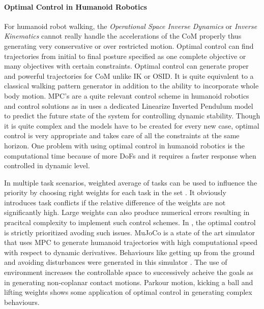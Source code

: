 \paragraph{Optimal Control in Humanoid Robotics}
For humanoid robot walking, the \textit{Operational Space Inverse Dynamics} or \textit{Inverse Kinematics} cannot really handle the accelerations of the CoM properly thus generating very conservative or over restricted motion. Optimal control can find 
trajectories from initial to final posture specified as one complete objective or many objectives with certain constraints. Optimal control can generate proper and powerful trajectories for CoM unlike IK or OSID. It is quite equivalent to a classical walking pattern generator in addition to the ability to incorporate whole body motion. MPC's are a quite relevant control scheme in humanoid robotics and control solutions as in \cite{kajita2003biped,herdt2010online} uses a dedicated Linearize Inverted Pendulum model to predict the future state of the system for controlling dynamic stability. Though it is quite complex and the models have to be created for every new case, optimal control is very appropriate and takes care of all the constraints at the same horizon. One problem with using optimal control in humanoid robotics is the computational time because of more DoFs and it requires a faster response when controlled in dynamic level.

In multiple task scenarios, weighted average of tasks can be used to influence the priority by choosing right weights for each task in the set \cite{dimitrov2011sparse}. It obviously introduces task conflicts if the relative difference of the weights are not significantly high. Large weights can also produce numerical errors resulting in pracitcal complexity to implement such control schemes. In \cite{del2014prioritized}, the optimal control is strictly prioritized avoding such issues. MuJoCo is a state of the art simulator that uses MPC to generate humanoid trajectories with high computational speed with respect to dynamic derivatives\cite{todorov2012mujoco}. Behaviours like getting up from the ground and avoiding disturbances were generated in this simulator \cite{tassa2012synthesis}.  The use of environment increases the controllable space to successively acheive the goals as in \cite{lengagne2013generation} generating non-coplanar contact motions. Parkour motion\cite{dellin2012framework}, kicking a ball \cite{miossec2006development} and  lifting weights \cite{arisumi2008dynamic} shows some application of optimal control in generating complex behaviours.

